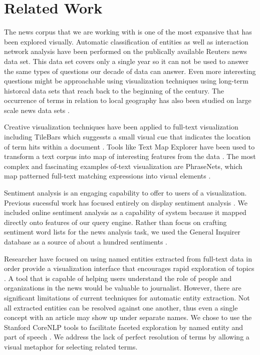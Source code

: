 \section{Related Work}
The news corpus that we are working with is one of the most expansive that has been explored visually.  Automatic classification of entities \cite{wermter2002selforganizing} as well as interaction network analysis \cite{johnson2004network} have been performed on the publically available Reuters news data set.  This data set covers only a single year so it can not be used to answer the same types of questions our decade of data can answer.  Even more interesting questions might be approachable using visualization techniques using long-term historcal data sets that reach back to the beginning of the century.  The occurrence of terms in relation to local geography has also been studied on large scale news data sets \cite{mehler2006spatial}.

Creative visualization techniques have been applied to full-text visualization including TileBars which suggessts a small visual cue that indicates the location of term hits within a document \cite{hearst1995tilebars}.  Tools like Text Map Explorer have been used to transform a text corpus into map of interesting features from the data \cite{paulovich2006text}.  The most complex and fascinating examples of-text visualization are PhraseNets, which map patterned full-text matching expressions into visual elements \cite{phrasenets}.

Sentiment analysis is an engaging capability to offer to users of a visualization.  Previous sucessful work has focused entirely on display sentiment analysis \cite{wanner2009visual}.  We included online sentiment analysis as a capability of system because it mapped directly onto features of our query engine.  Rather than focus on crafting sentiment word lists for the news analysis task, we used the General Inquirer database as a source of about a hundred sentiments \cite{generalinquirer}.

Researcher have focused on using named entities extracted from full-text data in order provide a visualization interface that encourages rapid exploration of topics \cite{grobelnik2004visualization}.  A tool that is capable of helping users understand the role of people and organizations in the news would be valuable to journalist.  However, there are significant limitations of current techniques for automatic entity extraction.  Not all extracted entities can be resolved against one another, thus even a single concept with an article may show up under separate names.  We chose to use the Stanford CoreNLP tools to facilitate faceted exploration by named entity and part of speech \cite{finkel2005incorporating,toutanova2003feature}.  We address the lack of perfect resolution of terms by allowing a visual metaphor for selecting related terms.

